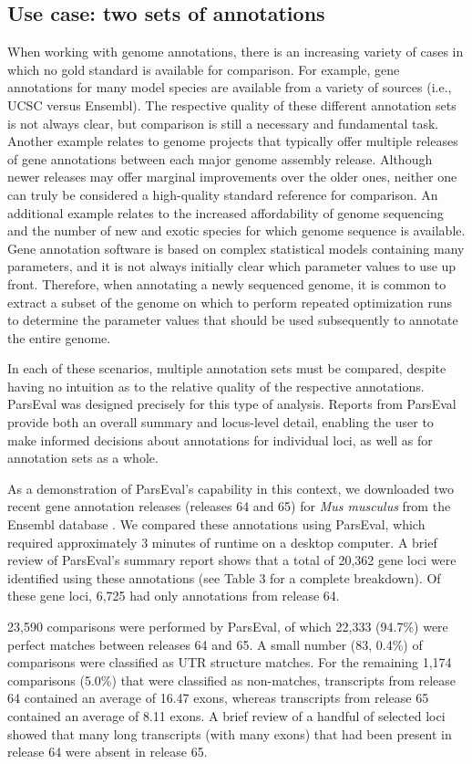 \subsection{Use case: two sets of annotations}
When working with genome annotations, there is an increasing variety of cases in which no gold standard is available for comparison.
For example, gene annotations for many model species are available from a variety of sources (i.e., UCSC versus Ensembl).
The respective quality of these different annotation sets is not always clear, but comparison is still a necessary and fundamental task.
Another example relates to genome projects that typically offer multiple releases of gene annotations between each major genome assembly release.
Although newer releases may offer marginal improvements over the older ones, neither one can truly be considered a high-quality standard reference for comparison.
An additional example relates to the increased affordability of genome sequencing and the number of new and exotic species for which genome sequence is available.
Gene annotation software is based on complex statistical models containing many parameters, and it is not always initially clear which parameter values to use up front.
Therefore, when annotating a newly sequenced genome, it is common to extract a subset of the genome on which to perform repeated optimization runs to determine the parameter values that should be used subsequently to annotate the entire genome.

In each of these scenarios, multiple annotation sets must be compared, despite having no intuition as to the relative quality of the respective annotations.
ParsEval was designed precisely for this type of analysis.
Reports from ParsEval provide both an overall summary and locus-level detail, enabling the user to make informed decisions about annotations for individual loci, as well as for annotation sets as a whole.

As a demonstration of ParsEval's capability in this context, we downloaded two recent gene annotation releases (releases 64 and 65) for \textit{Mus musculus} from the Ensembl database \citep{ensembl}.
We compared these annotations using ParsEval, which required approximately 3 minutes of runtime on a desktop computer.
A brief review of ParsEval's summary report shows that a total of 20,362 gene loci were identified using these annotations (see Table 3 for a complete breakdown).
Of these gene loci, 6,725 had only annotations from release 64.

23,590 comparisons were performed by ParsEval, of which 22,333 (94.7\%) were perfect matches between releases 64 and 65.
A small number (83, 0.4\%) of comparisons were classified as UTR structure matches.
For the remaining 1,174 comparisons (5.0\%) that were classified as non-matches, transcripts from release 64 contained an average of 16.47 exons, whereas transcripts from release 65 contained an average of 8.11 exons.
A brief review of a handful of selected loci showed that many long transcripts (with many exons) that had been present in release 64 were absent in release 65.

